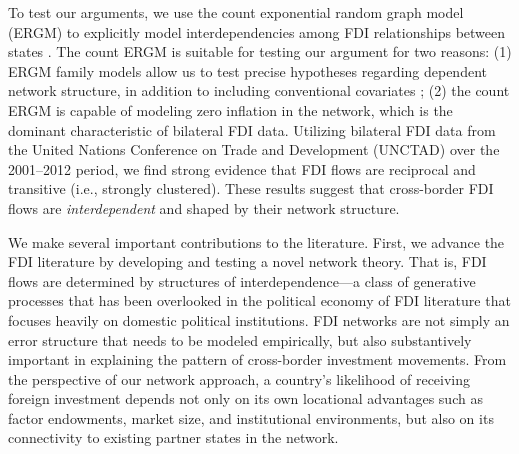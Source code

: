 \documentclass[reqno,onecolumn,letterpaper,12pt]{article}
\begin{document}
To test our arguments, we use the count exponential random graph model (ERGM) to explicitly model interdependencies among FDI relationships between states \citep{krivitsky2012exponential}. The count ERGM is suitable for testing our argument for two reasons: (1) ERGM family models allow us to test precise hypotheses regarding dependent network structure, in addition to including conventional covariates \citep{desmarais2017statistical}; (2) the count ERGM is capable of modeling zero inflation in the network, which is the dominant characteristic of bilateral FDI data. Utilizing bilateral FDI data from the United Nations Conference on Trade and Development (UNCTAD) over the 2001--2012 period, we find strong evidence that FDI flows are reciprocal and transitive (i.e., strongly clustered). These results suggest that cross-border FDI flows are \textit{interdependent} and shaped by their network structure. %

We make several important contributions to the literature. First, we advance the FDI literature by developing and testing a novel network theory. That is, FDI flows are determined by structures of interdependence---a class of generative processes that has been overlooked in the political economy of FDI literature that focuses heavily on domestic political institutions. %
FDI networks are not simply an error structure that needs to be modeled empirically, but also substantively important in explaining the pattern of cross-border investment movements. From the perspective of our network approach, a country's likelihood of receiving foreign investment depends not only on its own locational advantages such as factor endowments, market size, and institutional environments, but also on its connectivity to existing partner states in the network. %
\end{document}
